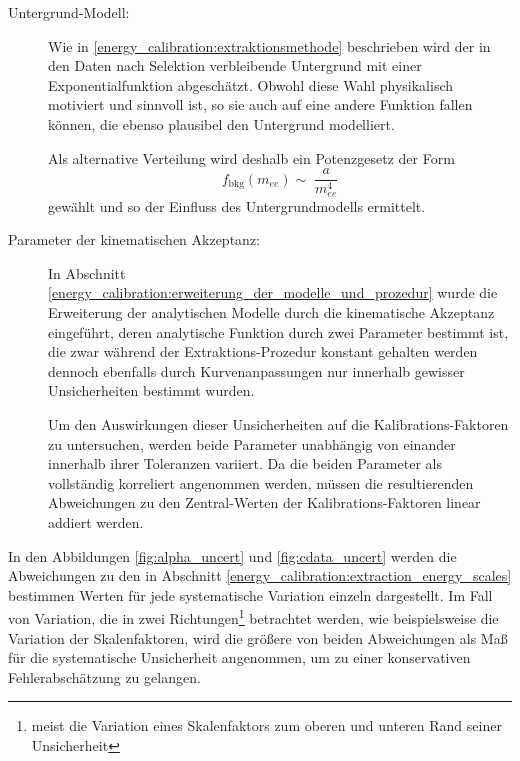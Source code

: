\begin{description}
    \item[Untergrund-Modell:]
        Wie in \ref{energy_calibration:extraktionsmethode} beschrieben wird der
        in den Daten nach Selektion verbleibende Untergrund mit einer
        Exponentialfunktion abgeschätzt. Obwohl diese Wahl physikalisch
        motiviert und sinnvoll ist, so sie auch auf eine andere Funktion fallen
        können, die ebenso plausibel den Untergrund modelliert.

        Als alternative Verteilung wird deshalb ein Potenzgesetz der Form
        \[
            f_\text{bkg}(m_{ee}) \sim\;\frac{a}{m_{ee}^4}
        \]
        gewählt und so der Einfluss des Untergrundmodells ermittelt.

    \item[Parameter der kinematischen Akzeptanz:]
        In Abschnitt
        \ref{energy_calibration:erweiterung_der_modelle_und_prozedur} wurde die
        Erweiterung der analytischen Modelle durch die kinematische Akzeptanz
        eingeführt, deren analytische Funktion durch zwei Parameter bestimmt
        ist, die zwar während der Extraktions-Prozedur konstant gehalten werden
        dennoch ebenfalls durch Kurvenanpassungen nur innerhalb gewisser
        Unsicherheiten bestimmt wurden.

        Um den Auswirkungen dieser Unsicherheiten auf die Kalibrations-Faktoren
        zu untersuchen, werden beide Parameter unabhängig von einander
        innerhalb ihrer Toleranzen variiert. Da die beiden Parameter als
        vollständig korreliert angenommen werden, müssen die resultierenden
        Abweichungen zu den Zentral-Werten der Kalibrations-Faktoren linear
        addiert werden.
\end{description}

In den Abbildungen \ref{fig:alpha_uncert} und \ref{fig:cdata_uncert} werden die
Abweichungen zu den in Abschnitt
\ref{energy_calibration:extraction_energy_scales} bestimmen Werten für jede
systematische Variation einzeln dargestellt. Im Fall von Variation, die in
zwei Richtungen\footnote{meist die Variation eines Skalenfaktors zum oberen und
unteren Rand seiner Unsicherheit} betrachtet werden, wie beispielsweise die
Variation der Skalenfaktoren, wird die größere von beiden Abweichungen als Maß
für die systematische Unsicherheit angenommen, um zu einer konservativen
Fehlerabschätzung zu gelangen.

